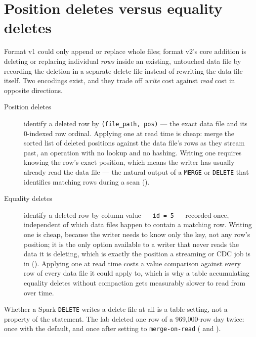 \section{Position deletes versus equality deletes}
\label{sec:ice-delete-files}

Format v1 could only append or replace whole files; format v2's core addition
is deleting or replacing individual \emph{rows} inside an existing, untouched
data file by recording the deletion in a separate delete file instead of
rewriting the data file itself. Two encodings exist, and they trade off
\emph{write} cost against \emph{read} cost in opposite directions.

\begin{description}
  \item[Position deletes] identify a deleted row by \texttt{(file\_path,
        pos)} --- the exact data file and its 0-indexed row ordinal. Applying
        one at read time is cheap: merge the sorted list of deleted
        positions against the data file's rows as they stream past, an
        operation with no lookup and no hashing. Writing one requires
        knowing the row's exact position, which means the writer has usually
        already read the data file --- the natural output of a
        \texttt{MERGE} or \texttt{DELETE} that identifies matching rows
        during a scan ().
  \item[Equality deletes] identify a deleted row by column value ---
        \texttt{id = 5} --- recorded once, independent of which data files
        happen to contain a matching row. Writing one is cheap, because the
        writer needs to know only the key, not any row's position; it is the
        only option available to a writer that never reads the data it is
        deleting, which is exactly the position a streaming or CDC job is in
        (). Applying one at read time costs a value
        comparison against every row of every data file it could apply to,
        which is why a table accumulating equality deletes without
        compaction gets measurably slower to read from over time.
\end{description}

Whether a Spark \texttt{DELETE} writes a delete file at all is a table setting, not
a property of the statement. The lab deleted one row of a 969,000-row day twice:
once with the default, and once after setting  to
\texttt{merge-on-read} ( and
).

